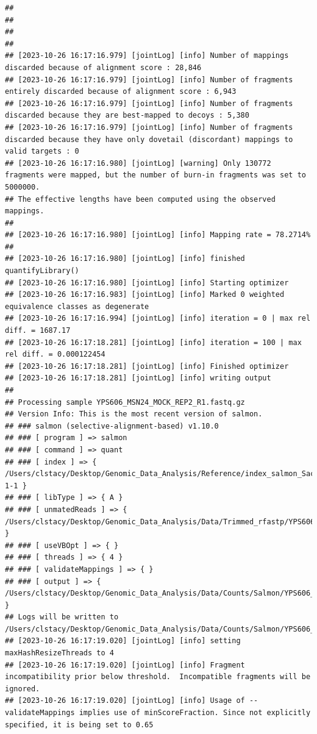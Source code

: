 \documentclass[
]{book}
\begin{document}
\begin{verbatim}
## 
## 
## 
## 
## [2023-10-26 16:17:16.979] [jointLog] [info] Number of mappings discarded because of alignment score : 28,846
## [2023-10-26 16:17:16.979] [jointLog] [info] Number of fragments entirely discarded because of alignment score : 6,943
## [2023-10-26 16:17:16.979] [jointLog] [info] Number of fragments discarded because they are best-mapped to decoys : 5,380
## [2023-10-26 16:17:16.979] [jointLog] [info] Number of fragments discarded because they have only dovetail (discordant) mappings to valid targets : 0
## [2023-10-26 16:17:16.980] [jointLog] [warning] Only 130772 fragments were mapped, but the number of burn-in fragments was set to 5000000.
## The effective lengths have been computed using the observed mappings.
## 
## [2023-10-26 16:17:16.980] [jointLog] [info] Mapping rate = 78.2714%
## 
## [2023-10-26 16:17:16.980] [jointLog] [info] finished quantifyLibrary()
## [2023-10-26 16:17:16.980] [jointLog] [info] Starting optimizer
## [2023-10-26 16:17:16.983] [jointLog] [info] Marked 0 weighted equivalence classes as degenerate
## [2023-10-26 16:17:16.994] [jointLog] [info] iteration = 0 | max rel diff. = 1687.17
## [2023-10-26 16:17:18.281] [jointLog] [info] iteration = 100 | max rel diff. = 0.000122454
## [2023-10-26 16:17:18.281] [jointLog] [info] Finished optimizer
## [2023-10-26 16:17:18.281] [jointLog] [info] writing output 
## 
## Processing sample YPS606_MSN24_MOCK_REP2_R1.fastq.gz
## Version Info: This is the most recent version of salmon.
## ### salmon (selective-alignment-based) v1.10.0
## ### [ program ] => salmon 
## ### [ command ] => quant 
## ### [ index ] => { /Users/clstacy/Desktop/Genomic_Data_Analysis/Reference/index_salmon_Saccharomyces_cerevisiae.R64-1-1 }
## ### [ libType ] => { A }
## ### [ unmatedReads ] => { /Users/clstacy/Desktop/Genomic_Data_Analysis/Data/Trimmed_rfastp/YPS606_MSN24_MOCK_REP2_R1.fastq.gz }
## ### [ useVBOpt ] => { }
## ### [ threads ] => { 4 }
## ### [ validateMappings ] => { }
## ### [ output ] => { /Users/clstacy/Desktop/Genomic_Data_Analysis/Data/Counts/Salmon/YPS606_MSN24_MOCK_REP2_R1.fastq.gz_quant }
## Logs will be written to /Users/clstacy/Desktop/Genomic_Data_Analysis/Data/Counts/Salmon/YPS606_MSN24_MOCK_REP2_R1.fastq.gz_quant/logs
## [2023-10-26 16:17:19.020] [jointLog] [info] setting maxHashResizeThreads to 4
## [2023-10-26 16:17:19.020] [jointLog] [info] Fragment incompatibility prior below threshold.  Incompatible fragments will be ignored.
## [2023-10-26 16:17:19.020] [jointLog] [info] Usage of --validateMappings implies use of minScoreFraction. Since not explicitly specified, it is being set to 0.65

\end{verbatim}
\end{document}
